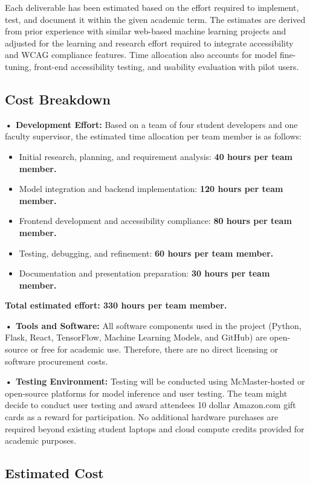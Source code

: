 \documentclass[12pt]{article}
\begin{document}
Each deliverable has been estimated based on the effort required to
implement, test, and document it within the given academic term.
The estimates are derived from prior experience with similar
web-based machine learning projects and adjusted for the learning and
research effort required to integrate accessibility and WCAG
compliance features.
Time allocation also accounts for model fine-tuning, front-end
accessibility testing, and usability evaluation with pilot users.

\subsection{Cost Breakdown}

\noindent\textbf{• Development Effort:} Based on a team of four
student developers and one faculty supervisor, the estimated time
allocation per team member is as follows:
\begin{itemize}
  \item Initial research, planning, and requirement analysis:
    \textbf{40 hours per team member.}
  \item Model integration and backend implementation: \textbf{120
    hours per team member.}
  \item Frontend development and accessibility compliance: \textbf{80
    hours per team member.}
  \item Testing, debugging, and refinement: \textbf{60 hours per team member.}
  \item Documentation and presentation preparation: \textbf{30 hours
    per team member.}
\end{itemize}
\noindent\textbf{Total estimated effort: 330 hours per team member.}

\noindent\textbf{• Tools and Software:}
All software components used in the project (Python, Flask, React,
TensorFlow, Machine Learning Models, and GitHub) are open-source or
free for academic use.
Therefore, there are no direct licensing or software procurement costs.

\noindent\textbf{• Testing Environment:}
Testing will be conducted using McMaster-hosted or open-source
platforms for model inference and user testing.
The team might decide to conduct user testing and award attendees 10
dollar Amazon.com gift cards as a reward for participation.
No additional hardware purchases are required beyond existing student
laptops and cloud compute credits provided for academic purposes.

\subsection{Estimated Cost}
\end{document}
